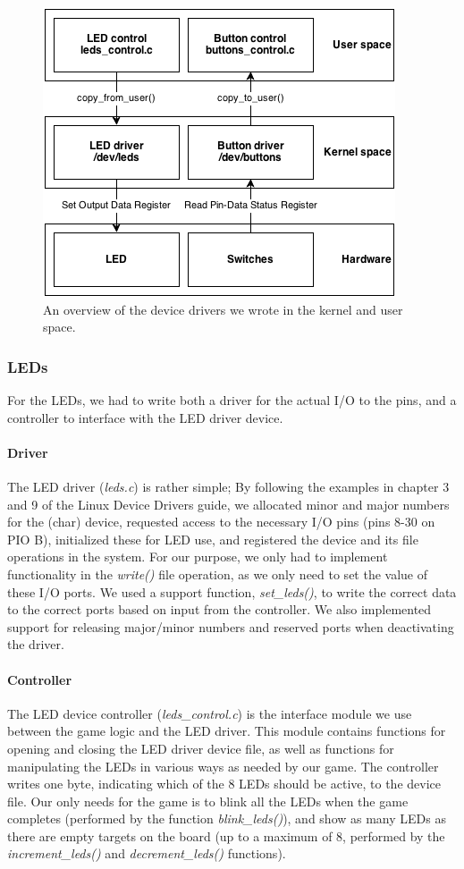 \documentclass[a4paper,11pt]{article}
\begin{document}
\begin{figure}[H]
\centering
\includegraphics[scale=0.6]{images/devicedrivers.png}
\caption{An overview of the device drivers we wrote in the kernel and user space.}
\label{fig:devicedrivers}
\end{figure}

\subsubsection{LEDs}
For the LEDs, we had to write both a driver for the actual I/O to the pins, and a controller to interface with the LED driver device.
\paragraph{Driver} The LED driver (\textit{leds.c}) is rather simple; By following the examples in chapter 3 and 9 of the Linux Device Drivers guide\cite{ldd}, we allocated minor and major numbers for the (char) device, requested access to the necessary I/O pins (pins 8-30 on PIO B), initialized these for LED use, and registered the device and its file operations in the system. For our purpose, we only had to implement functionality in the \textit{write()} file operation, as we only need to set the value of these I/O ports. We used a support function, \textit{set\_leds()}, to write the correct data to the correct ports based on input from the controller. We also implemented support for releasing major/minor numbers and reserved ports when deactivating the driver.
\paragraph{Controller} The LED device controller (\textit{leds\_control.c}) is the interface module we use between the game logic and the LED driver. This module contains functions for opening and closing the LED driver device file, as well as functions for manipulating the LEDs in various ways as needed by our game. The controller writes one byte, indicating which of the 8 LEDs should be active, to the device file. Our only needs for the game is to blink all the LEDs when the game completes (performed by the function \textit{blink\_leds()}), and show as many LEDs as there are empty targets on the board (up to a maximum of 8, performed by the \textit{increment\_leds()} and \textit{decrement\_leds()} functions).
\end{document}
